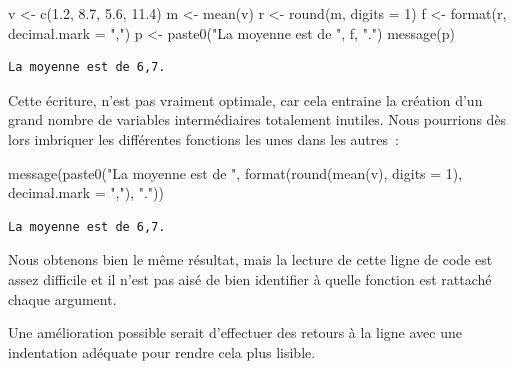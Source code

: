 \documentclass[
  letterpaper,
  DIV=11,
  numbers=noendperiod,
  oneside]{scrreprt}
\newenvironment{Shaded}{\begin{snugshade}}{\end{snugshade}}
\newcommand{\AttributeTok}[1]{\textcolor[rgb]{0.40,0.45,0.13}{#1}}
\newcommand{\DecValTok}[1]{\textcolor[rgb]{0.68,0.00,0.00}{#1}}
\newcommand{\FloatTok}[1]{\textcolor[rgb]{0.68,0.00,0.00}{#1}}
\newcommand{\FunctionTok}[1]{\textcolor[rgb]{0.28,0.35,0.67}{#1}}
\newcommand{\NormalTok}[1]{\textcolor[rgb]{0.00,0.23,0.31}{#1}}
\newcommand{\OtherTok}[1]{\textcolor[rgb]{0.00,0.23,0.31}{#1}}
\newcommand{\StringTok}[1]{\textcolor[rgb]{0.13,0.47,0.30}{#1}}
\begin{document}
\begin{Shaded}
\begin{Highlighting}[]
\NormalTok{v }\OtherTok{\textless{}{-}} \FunctionTok{c}\NormalTok{(}\FloatTok{1.2}\NormalTok{, }\FloatTok{8.7}\NormalTok{, }\FloatTok{5.6}\NormalTok{, }\FloatTok{11.4}\NormalTok{)}
\NormalTok{m }\OtherTok{\textless{}{-}} \FunctionTok{mean}\NormalTok{(v)}
\NormalTok{r }\OtherTok{\textless{}{-}} \FunctionTok{round}\NormalTok{(m, }\AttributeTok{digits =} \DecValTok{1}\NormalTok{)}
\NormalTok{f }\OtherTok{\textless{}{-}} \FunctionTok{format}\NormalTok{(r, }\AttributeTok{decimal.mark =} \StringTok{","}\NormalTok{)}
\NormalTok{p }\OtherTok{\textless{}{-}} \FunctionTok{paste0}\NormalTok{(}\StringTok{"La moyenne est de "}\NormalTok{, f, }\StringTok{"."}\NormalTok{)}
\FunctionTok{message}\NormalTok{(p)}
\end{Highlighting}
\end{Shaded}

\begin{verbatim}
La moyenne est de 6,7.
\end{verbatim}

Cette écriture, n'est pas vraiment optimale, car cela entraine la
création d'un grand nombre de variables intermédiaires totalement
inutiles. Nous pourrions dès lors imbriquer les différentes fonctions
les unes dans les autres~:

\begin{Shaded}
\begin{Highlighting}[]
\FunctionTok{message}\NormalTok{(}\FunctionTok{paste0}\NormalTok{(}\StringTok{"La moyenne est de "}\NormalTok{, }\FunctionTok{format}\NormalTok{(}\FunctionTok{round}\NormalTok{(}\FunctionTok{mean}\NormalTok{(v),        }\AttributeTok{digits =} \DecValTok{1}\NormalTok{), }\AttributeTok{decimal.mark =} \StringTok{","}\NormalTok{), }\StringTok{"."}\NormalTok{))}
\end{Highlighting}
\end{Shaded}

\begin{verbatim}
La moyenne est de 6,7.
\end{verbatim}

Nous obtenons bien le même résultat, mais la lecture de cette ligne de
code est assez difficile et il n'est pas aisé de bien identifier à
quelle fonction est rattaché chaque argument.

Une amélioration possible serait d'effectuer des retours à la ligne avec
une indentation adéquate pour rendre cela plus lisible.
\end{document}
